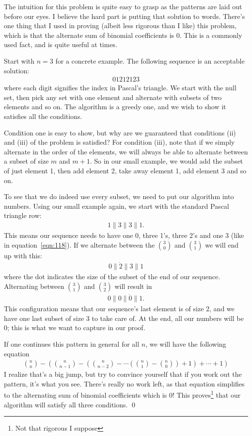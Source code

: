 \begin{Exercise}
The intuition for this problem is quite easy to grasp as the patterns are laid out before our eyes.
I believe the hard part is putting that solution to words. 
There's one thing that I used in proving (albeit less rigorous than I like) this problem, which is that the 
alternate sum of binomial coefficients is 0. This is a commonly used fact, and is quite useful at times. 

Start with $n=3$ for a concrete example. The following sequence is an acceptable solution: 
\begin{align}
	01212123
	\label{eqn:118}
\end{align}
where each digit signifies the index in Pascal's triangle. We start with the null set, then pick any set with one element 
and alternate with subsets of two elements and so on.
The algorithm is a greedy one, and we wish to show it satisfies all the conditions.

Condition one is easy to show, but why are we guaranteed that conditions (ii) and (iii) of the problem is satisfied?
For condition (iii), note that if we simply alternate in the order of the elements, we will always be able to alternate between
a subset of size $m$ and $m+1$. So in our small example, we would add the subset of just element 1, then add element 2, take 
away element 1, add element 3 and so on.

To see that we do indeed use every subset, we need to put our algorithm into numbers. Using our small example again,
we start with the standard Pascal triangle row: 
\begin{align}
	1\| 3 \| 3 \| 1.
\end{align}
This means our sequence needs to have one 0, three 1's, three 2's and one 3 (like in equation~\ref{eqn:118}).
If we alternate between the $\binom{3}{0}$ and $\binom{3}{1}$ we will end up with this:
\begin{align}
	0\| \dot{2} \| 3 \| 1
\end{align}
where the dot indicates the size of the subset of the end of our sequence. 
Alternating between $\binom{3}{1}$ and $\binom{3}{2}$ will result in 
\begin{align}
	0\| 0 \| \dot{0} \| 1.
\end{align}
This configuration means that our sequence's last element is of size 2, and we have one last subset of size 3 to take care of.
At the end, all our numbers will be 0; this is what we want to capture in our proof.

If one continues this pattern in general for all $n$, we will have the following equation
\begin{align}
	{n \choose n} - \left( {n\choose n-1} - \left( {n \choose n-2} - \cdots \left( {n \choose 1} - {n \choose 0} \right) +1 \right) + \cdots +1 \right)
\end{align}
I realize that's a big jump, but try to convince yourself that if you work out the pattern, it's what you see. 
There's really no work left, as that equation simplifies to the alternating sum of binomial coefficients which is 0! 
This proves\footnote{Not that rigorous I suppose} that our algorithm will satisfy all three conditions. \qed
\end{Exercise}

